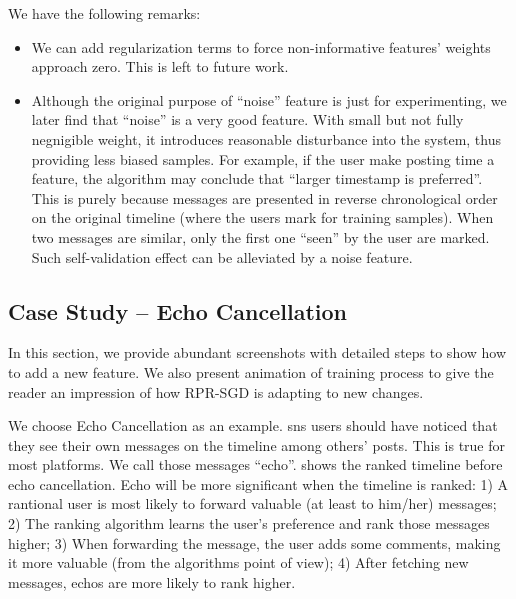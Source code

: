 \documentclass{sig-alternate}
\begin{document}
We have the following remarks:
\begin{itemize}
	\item We can add regularization terms to force non-informative features' 
		weights approach zero. 
		This is left to future work. 
	\item Although the original purpose of ``noise'' feature is just for experimenting, 
		we later find that ``noise'' is a very good feature. 
		With small but not fully negnigible weight, 
		it introduces reasonable disturbance into the system, 
		thus providing less biased samples. 
		For example, if the user make posting time a feature, 
		the algorithm may conclude that ``larger timestamp is preferred''.
		This is purely because messages are presented in reverse chronological order on the original timeline
		(where the users mark for training samples). 
		When two messages are similar, only the first one ``seen'' by the user are marked. 
		Such self-validation effect can be alleviated by a noise feature. 
\end{itemize}

\subsection{Case Study -- Echo Cancellation}
\label{sec:Case Study -- Echo Cancellation}

In this section, we provide abundant screenshots with detailed steps 
to show how to add a new feature. 
We also present animation of training process to 
give the reader an impression of how RPR-SGD is adapting to new changes.  

We choose Echo Cancellation as an example. 
\gls{sns} users should have noticed that they see their own 
messages on the timeline among others' posts. 
This is true for most platforms. 
We call those messages ``echo''. 
\rfig{\ref{fig:echo_ranked_timeline_before}} shows the ranked timeline before echo cancellation. 
Echo will be more significant when the timeline is ranked: 
1) A rantional user is most likely to forward valuable (at least to him/her) messages;
2) The ranking algorithm learns the user's preference and rank those messages higher;
3) When forwarding the message, the user adds some comments, making it 
more valuable (from the algorithms point of view);
4) After fetching new messages, echos are more likely to rank higher. 
\end{document}
